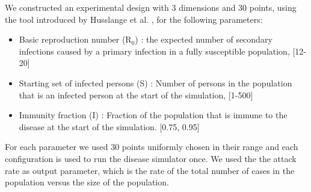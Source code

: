 We constructed an experimental design with 3 dimensions and 30 points, using the tool introduced by Husslange et al. \citep{DOE}, for the following parameters:
\begin{itemize}
\item Basic reproduction number (R$_0$) : the expected number of secondary infections caused by a primary infection in a fully susceptible population, [12-20]
\item Starting set of infected persons (S) : Number of persons in the population that is an infected person at the start of the simulation, [1-500]
\item Immunity fraction (I) : Fraction of the population that is immune to the disease at the start of the simulation. [0.75, 0.95]
\end{itemize}
For each parameter we used 30 points uniformly chosen in their range and each configuration is used to run the disease simulator once. 
We used the the attack rate as output parameter, which is the rate of the total number of cases in the population versus the size of the population. 



